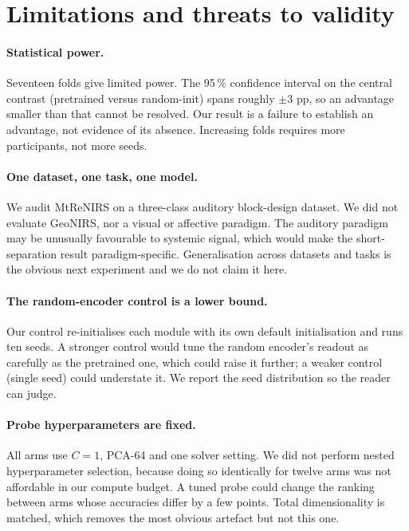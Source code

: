 \section{Limitations and threats to validity}
\label{sec:threats}

\paragraph{Statistical power.} Seventeen folds give limited power. The 95\,\% confidence interval
on the central contrast (pretrained versus random-init) spans roughly $\pm 3$ pp, so an advantage
smaller than that cannot be resolved. Our result is a failure to establish an advantage, not
evidence of its absence. Increasing folds requires more participants, not more seeds.

\paragraph{One dataset, one task, one model.} We audit MtReNIRS on a three-class auditory
block-design dataset. We did not evaluate GeoNIRS, nor a visual or affective paradigm. The
auditory paradigm may be unusually favourable to systemic signal, which would make the
short-separation result paradigm-specific. Generalisation across datasets and tasks is the
obvious next experiment and we do not claim it here.

\paragraph{The random-encoder control is a lower bound.} Our control re-initialises each module
with its own default initialisation and runs ten seeds. A stronger control would tune the random
encoder's readout as carefully as the pretrained one, which could raise it further; a weaker
control (single seed) could understate it. We report the seed distribution so the reader can
judge.

\paragraph{Probe hyperparameters are fixed.} All arms use $C=1$, PCA-64 and one solver setting.
We did not perform nested hyperparameter selection, because doing so identically for twelve arms
was not affordable in our compute budget. A tuned probe could change the ranking between arms
whose accuracies differ by a few points. Total dimensionality is matched, which removes the most
obvious artefact but not this one.

